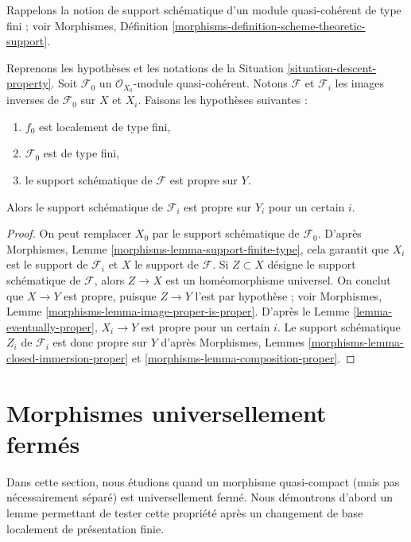 \noindent
Rappelons la notion de support schématique
d'un module quasi-cohérent de type fini ; voir
Morphismes, Définition \ref{morphisms-definition-scheme-theoretic-support}.

\begin{lemma}
\label{lemma-eventually-proper-support}
Reprenons les hypothèses et les notations de la Situation \ref{situation-descent-property}.
Soit $\mathcal{F}_0$ un $\mathcal{O}_{X_0}$-module quasi-cohérent.
Notons $\mathcal{F}$ et $\mathcal{F}_i$ les images inverses de
$\mathcal{F}_0$ sur $X$ et $X_i$. Faisons les hypothèses suivantes :
\begin{enumerate}
\item $f_0$ est localement de type fini,
\item $\mathcal{F}_0$ est de type fini,
\item le support schématique de $\mathcal{F}$ est propre sur $Y$.
\end{enumerate}
Alors le support schématique de $\mathcal{F}_i$ est propre sur $Y_i$
pour un certain $i$.
\end{lemma}

\begin{proof}
On peut remplacer $X_0$ par le support schématique de $\mathcal{F}_0$.
D'après Morphismes, Lemme \ref{morphisms-lemma-support-finite-type}, cela
garantit que $X_i$ est le support de $\mathcal{F}_i$ et $X$ le
support de $\mathcal{F}$. Si $Z \subset X$ désigne le support
schématique de $\mathcal{F}$, alors $Z \to X$ est un homéomorphisme
universel. On conclut que $X \to Y$ est propre, puisque
$Z \to Y$ l'est par hypothèse ; voir
Morphismes, Lemme \ref{morphisms-lemma-image-proper-is-proper}.
D'après le Lemme \ref{lemma-eventually-proper}, $X_i \to Y$ est propre
pour un certain $i$. Le support schématique $Z_i$ de
$\mathcal{F}_i$ est donc propre sur $Y$ d'après
Morphismes, Lemmes \ref{morphisms-lemma-closed-immersion-proper} et
\ref{morphisms-lemma-composition-proper}.
\end{proof}











\section{Morphismes universellement fermés}
\label{section-universally-closed}

\noindent
Dans cette section, nous étudions quand un morphisme quasi-compact (mais
pas nécessairement séparé) est universellement fermé. Nous démontrons d'abord
un lemme permettant de tester cette propriété après un changement de base
localement de présentation finie.

